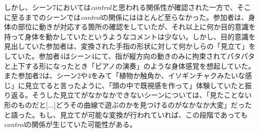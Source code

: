 しかし、シーン7においては\textit{control}と思われる関係性が確認された一方で、そこに至るまでのシーンでは\textit{control}の関係にはほとんど至らなかった。参加者は、身体の部位に動きが対応する箇所の確認をしていたが、それ以上に何か目的意識を持って身体を動かしていたというようなコメントは少ない。しかし、目的意識を見出していた参加者は、変換された手指の形状に対して何かしらの「見立て」をしていた。参加者4はシーン4にて、指が縦方向の動きのみに拘束されてパタパタと上下する形になったとき「ピアノの演奏」のような身体感覚を想起していた。また参加者2は、シーン2や4をみて「植物か触角か、イソギンチャクみたいな感じ」に見立てると言ったように、「頭の中で既視感を作って」体験していたと振り返る。そうした見立てがなかなかできないシーンについては、「見たことない形のものだと[...]どうその曲線で遊ぶのかを見つけるのがなかなか大変」だったと語った。もし、見立てが可能な変換が行われていれば、この段階であっても\textit{control}の関係が生じていた可能性がある。



